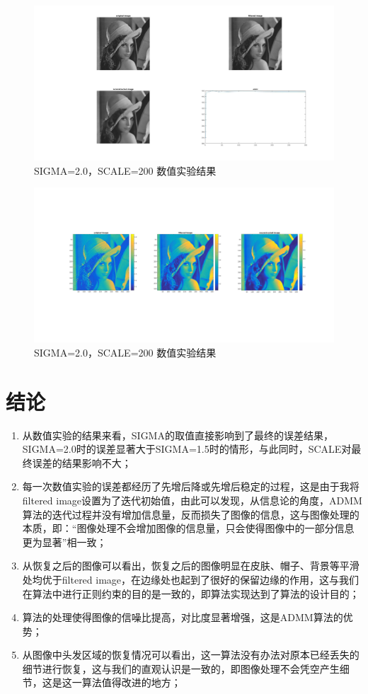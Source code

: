\documentclass[a4paper, UTF8]{ctexrep}
\begin{document}
				\begin{figure}[htbp!]
					\includegraphics[width = 1 \textwidth]{fig8.jpg}
					\caption{SIGMA=2.0，SCALE=200 数值实验结果}
				\end{figure}
				\begin{figure}[htbp!]
					\includegraphics[width = 1 \textwidth]{fig9.jpg}
					\caption{SIGMA=2.0，SCALE=200 数值实验结果}
				\end{figure}
			\section{结论}
			\begin{enumerate}
				\item 从数值实验的结果来看，SIGMA的取值直接影响到了最终的误差结果，SIGMA=2.0时的误差显著大于SIGMA=1.5时的情形，与此同时，SCALE对最终误差的结果影响不大；
				\item 每一次数值实验的误差都经历了先增后降或先增后稳定的过程，这是由于我将filtered image设置为了迭代初始值，由此可以发现，从信息论的角度，ADMM算法的迭代过程并没有增加信息量，反而损失了图像的信息，这与图像处理的本质，即：“图像处理不会增加图像的信息量，只会使得图像中的一部分信息更为显著”相一致；
				\item 从恢复之后的图像可以看出，恢复之后的图像明显在皮肤、帽子、背景等平滑处均优于filtered image，在边缘处也起到了很好的保留边缘的作用，这与我们在算法中进行正则约束的目的是一致的，即算法实现达到了算法的设计目的；
				\item 算法的处理使得图像的信噪比提高，对比度显著增强，这是ADMM算法的优势；
				\item 从图像中头发区域的恢复情况可以看出，这一算法没有办法对原本已经丢失的细节进行恢复，这与我们的直观认识是一致的，即图像处理不会凭空产生细节，这是这一算法值得改进的地方；
			\end{enumerate}
\end{document}
